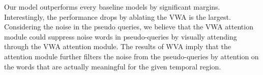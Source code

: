 Our model outperforms every baseline models by significant margins. 
Interestingly, the performance drops by ablating the VWA is the largest. 
Considering the noise in the pseudo queries, we believe that the VWA attention module could suppress noise words in pseudo-queries by visually attending through the VWA attention module. 
The results of WVA imply that the attention module further filters the noise from the pseudo-queries by attention on the words that are actually meaningful for the given temporal region.


\begin{table}[t]
\centering
{}
\caption{\textbf{Model ablations.} We compare the full model to the ablated ones (word-to-video attention: WVA, video-to-word attention: VWA, multimodal cross attention: MCA), and the current state-of-the-art~\cite{mun2020LGI} model trained with the pseudo-supervision.}
\vspace{-1em}
\label{table:model_ablation}
\end{table}


